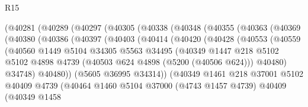 \begin{lexlean}{R15}
\begin{coremodule}
{{{{{{{{{{{              (@40281
                (@40289
                  (@40297
                    (@40305
                      (@40338
                        (@40348
                          (@40355
                            (@40363
                              (@40369
                                (@40380
                                  (@40386
                                    (@40397
                                      (@40403
                                        (@40414
                                          (@40420
                                            (@40428
                                              (@40553
                                                (@40559
                                                  (@40560
                                                    @1449
                                                    @5104
                                                    @34305
                                                    @5563
                                                    @34495
                                                    (@40349
                                                      @1447
                                                      @218
                                                      @5102
                                                      @5102
                                                      @4898
                                                      @4739
                                                      (@40503 @624 @4898 (@5200 (@40506 @624)))
                                                      @40480)
                                                    @34748)
                                                  @40480))
                                              (@5605 @36995 @34314))
                                            (@40349
                                              @1461
                                              @218
                                              @37001
                                              @5102
                                              @40409
                                              @4739
                                              (@40464
                                                @1460
                                                @5104
                                                @37000
                                                (@4743 @1457 @4739)
                                                @40409
                                                (@40349
                                                  @1458
}}}}}}}}}}}
\end{coremodule}
\end{lexlean}
